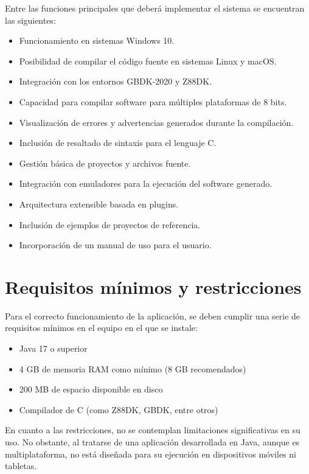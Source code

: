 \documentclass[../../main.tex]{subfiles}
\begin{document}
\par{Entre las funciones principales que deberá implementar el sistema se encuentran las siguientes:}

\begin{itemize}
    \item Funcionamiento en sistemas Windows 10.
    \item Posibilidad de compilar el código fuente en sistemas Linux y macOS.
    \item Integración con los entornos GBDK-2020 y Z88DK.
    \item Capacidad para compilar software para múltiples plataformas de 8 bits.
    \item Visualización de errores y advertencias generados durante la compilación.
    \item Inclusión de resaltado de sintaxis para el lenguaje C.
    \item Gestión básica de proyectos y archivos fuente.
    \item Integración con emuladores para la ejecución del software generado.
    \item Arquitectura extensible basada en plugins.
    \item Inclusión de ejemplos de proyectos de referencia.
    \item Incorporación de un manual de uso para el usuario.
\end{itemize}

\clearpage


\section{Requisitos mínimos y restricciones}

Para el correcto funcionamiento de la aplicación, se deben cumplir una serie de requisitos mínimos en el equipo en el que se instale:
\begin{itemize}
    \item Java 17 o superior 
    \item 4 GB de memoria RAM como mínimo (8 GB recomendados) 
    \item 200 MB de espacio disponible en disco 
    \item Compilador de C (como Z88DK, GBDK, entre otros) 
\end{itemize}
En cuanto a las restricciones, no se contemplan limitaciones significativas en su uso. No obstante, al tratarse de una aplicación desarrollada en Java, aunque es multiplataforma, no está diseñada para su ejecución en dispositivos móviles ni tabletas.
\end{document}
